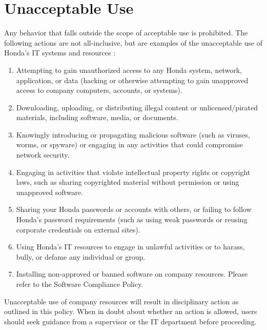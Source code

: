 \section{Unacceptable Use}
Any behavior that falls outside the scope of acceptable use is prohibited. The following actions are not all-inclusive, but are examples of the unacceptable use of Honda's IT systems and resources :
\begin{enumerate}
    \item Attempting to gain unauthorized access to any Honda system, network, application, or data (hacking or otherwise attempting to gain unapproved access to company computers, accounts, or systems).
    \item Downloading, uploading, or distributing illegal content or unlicensed/pirated materials, including software, media, or documents.
    \item Knowingly introducing or propagating malicious software (such as viruses, worms, or spyware) or engaging in any activities that could compromise network security.
    \item Engaging in activities that violate intellectual property rights or copyright laws, such as sharing copyrighted material without permission or using unapproved software.
    \item Sharing your Honda passwords or accounts with others, or failing to follow Honda's password requirements (such as using weak passwords or reusing corporate credentials on external sites).
    \item Using Honda's IT resources to engage in unlawful activities or to harass, bully, or defame any individual or group.
    \item Installing non-approved or banned software on company resources. Please refer to the Software Compliance Policy. 
\end{enumerate}
Unacceptable use of company resources will result in disciplinary action as outlined in this policy. When in doubt about whether an action is allowed, users should seek guidance from a supervisor or the IT department before proceeding.

